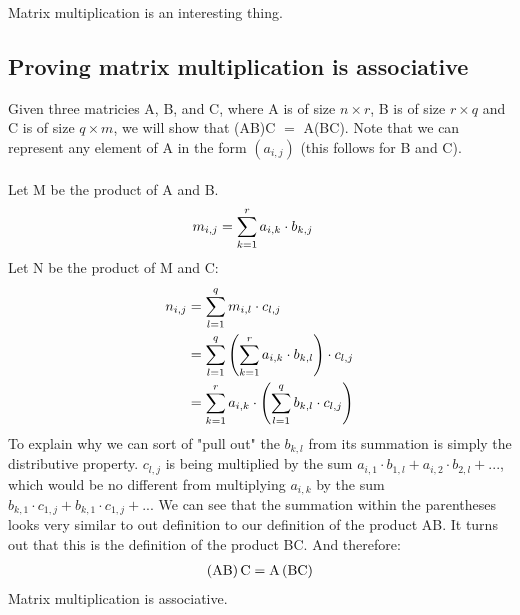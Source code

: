\documentclass[../main.tex]{subfiles}
\begin{document}
Matrix multiplication is an interesting thing. 
\subsection{Proving matrix multiplication is associative}
Given three matricies A, B, and C, where A is of size $n \times r$, B is of size $r \times q$ and C is of size $q \times m$, we will show that (AB)C $=$ A(BC). Note that we can represent any element of A in the form $(a_{i,j})$ (this follows for B and C). \\ \\
Let M be the product of A and B.
\begin{align}
	m_{i,j} &= \sum_{k=1}^{r} a_{i,k} \cdot b_{k,j} \notag 
\end{align}
Let N be the product of M and C:
\begin{align}
	n_{i, j} &= \sum_{l=1}^{q} m_{i,l} \cdot c_{l,j} \notag \\
		 &= \sum_{l=1}^{q} \left(\sum_{k=1}^{r} a_{i,k} \cdot b_{k,l}\right) \cdot c_{l,j} \notag \\
		 &= \sum_{k=1}^{r} a_{i,k} \cdot \left(\sum_{l=1}^{q} b_{k,l} \cdot c_{l,j}\right) \notag
\end{align}
To explain why we can sort of "pull out" the $b_{k,l}$ from its summation is simply the distributive property. $c_{l,j}$ is being multiplied by the sum $a_{i,1} \cdot b_{1,l} + a_{i,2} \cdot b_{2,l} + ...$, which would be no different from multiplying $a_{i,k}$ by the sum $b_{k,1} \cdot c_{1,j} + b_{k,1} \cdot c_{1,j} + ...$ We can see that the summation within the parentheses looks very similar to out definition to our definition of the product AB. It turns out that this is the definition of the product BC. And therefore:
\begin{align}
	\left(\mathrm{AB}\right)\mathrm{C} = \mathrm{A}\left(\mathrm{BC}\right) \notag
\end{align}
Matrix multiplication is associative.
\end{document}
